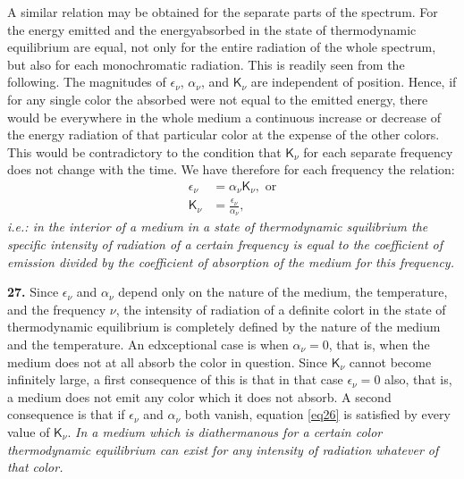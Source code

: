 \documentclass[12pt,oneside]{book}
\begin{document}
A similar relation may be obtained for the separate parts of the spectrum. For the energy emitted and the energyabsorbed in the state of thermodynamic equilibrium are equal, not only for the entire radiation of the whole spectrum, but also for each monochromatic radiation. This is readily seen from the following. The magnitudes of $\epsilon_\nu$, $\alpha_\nu$, and $\mathsf{K}_\nu$ are independent of position. Hence, if for any single color the absorbed were not equal to the emitted energy, there would be everywhere in the whole medium a continuous increase or decrease of the energy radiation of that particular color at the expense of the other colors. This would be contradictory to the condition that $\mathsf{K}_\nu$ for each separate frequency does not change with the time. We have therefore for each frequency the relation:
\begin{align}
    \epsilon_\nu&=\alpha_\nu\mathsf{K}_\nu, \text{ or} \label{eq26}\\
    \mathsf{K}_\nu&=\frac{\epsilon_\nu}{\alpha_\nu},
    \label{eq27}
\end{align}
\textit{i.e.: in the interior of a medium in a state of thermodynamic squilibrium the specific intensity of radiation of a certain frequency is equal to the coefficient of emission divided by the coefficient of absorption of the medium for this frequency.} \par

\textbf{27.} Since $\epsilon_\nu$ and $\alpha_\nu$ depend only on the nature of the medium, the temperature, and the frequency $\nu$, the intensity of radiation of a definite colort in the state of thermodynamic equilibrium is completely defined by the nature of the medium and the temperature. An edxceptional case is when $\alpha_\nu=0$, that is, when the medium does not at all absorb the color in question. Since $\mathsf{K}_\nu$ cannot become infinitely large, a first consequence of this is that in that case $\epsilon_\nu=0$ also, that is, a medium does not emit any color which it does not absorb. A second consequence is that if $\epsilon_\nu$ and $\alpha_\nu$ both vanish, equation \eqref{eq26} is satisfied by every value of $\mathsf{K}_\nu$. \textit{In a medium which is diathermanous for a certain color thermodynamic equilibrium can exist for any intensity of radiation whatever of that color.} \par
\end{document}

